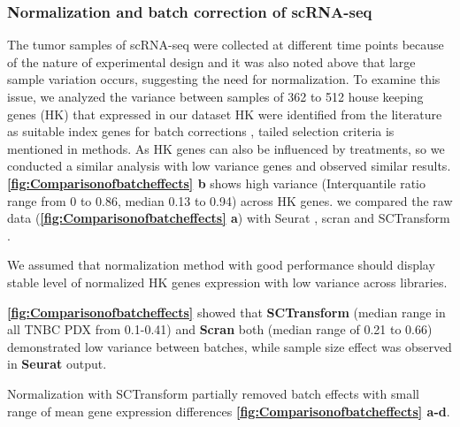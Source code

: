 \subsubsection{Normalization and batch correction of scRNA-seq}
The tumor samples of scRNA-seq were collected at different time points because of the nature of experimental design and it was also noted above that large sample variation occurs, suggesting the need for normalization. 
  To examine this issue, we analyzed the variance between samples of 362 to 512 house keeping genes (HK) that expressed in our dataset  HK were identified from the literature as suitable index genes for batch corrections \cite{lin2019evaluating}, tailed selection criteria is mentioned in methods.
As HK genes can also be influenced by treatments, so we conducted a similar analysis with low variance genes and observed similar results.
\textbf{\autoref{fig:Comparisonofbatcheffects} b} shows high variance (Interquantile ratio range from 0 to 0.86, median 0.13 to 0.94) across HK genes.
we compared the raw data (\textbf{\autoref{fig:Comparisonofbatcheffects} a}) with Seurat \cite{butler2018integrating}, scran \cite{lun2016pooling} and SCTransform \cite{hafemeister2019normalization}. 

We assumed that normalization method with good performance should display stable level of normalized HK genes expression with low variance across libraries.

\textbf{\autoref{fig:Comparisonofbatcheffects} } showed that  \textbf{SCTransform} (median range in all TNBC PDX from 0.1-0.41) and \textbf{Scran} both (median range of 0.21 to 0.66) demonstrated low variance between batches, while sample size effect was observed in \textbf{Seurat} output.

Normalization with SCTransform partially removed batch effects with small range of mean gene expression differences \textbf{\autoref{fig:Comparisonofbatcheffects} a-d}.
 
 

